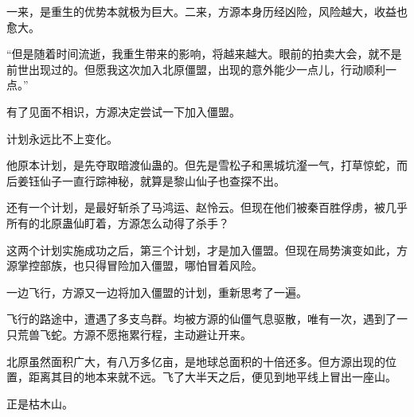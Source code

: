 \begin{this_body}
一来，是重生的优势本就极为巨大。二来，方源本身历经凶险，风险越大，收益也愈大。

“但是随着时间流逝，我重生带来的影响，将越来越大。眼前的拍卖大会，就不是前世出现过的。但愿我这次加入北原僵盟，出现的意外能少一点儿，行动顺利一点。”

有了见面不相识，方源决定尝试一下加入僵盟。

计划永远比不上变化。

他原本计划，是先夺取暗渡仙蛊的。但先是雪松子和黑城坑瀣一气，打草惊蛇，而后姜钰仙子一直行踪神秘，就算是黎山仙子也查探不出。

还有一个计划，是最好斩杀了马鸿运、赵怜云。但现在他们被秦百胜俘虏，被几乎所有的北原蛊仙盯着，方源怎么动得了杀手？

这两个计划实施成功之后，第三个计划，才是加入僵盟。但现在局势演变如此，方源掌控部族，也只得冒险加入僵盟，哪怕冒着风险。

一边飞行，方源又一边将加入僵盟的计划，重新思考了一遍。

飞行的路途中，遭遇了多支鸟群。均被方源的仙僵气息驱散，唯有一次，遇到了一只荒兽飞蛇。方源不愿拖累行程，主动避让开来。

北原虽然面积广大，有八万多亿亩，是地球总面积的十倍还多。但方源出现的位置，距离其目的地本来就不远。飞了大半天之后，便见到地平线上冒出一座山。

正是枯木山。

\end{this_body}


